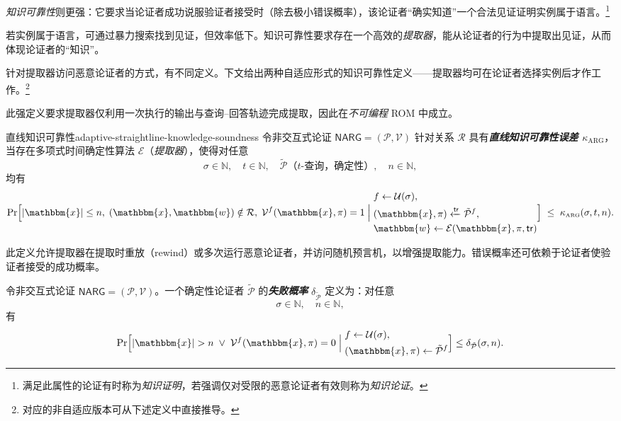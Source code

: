 \documentclass[american,singlepageview]{snargs-book-zh}
\newcommand{\defemph}[1]{\textbf{\emph{#1}}}
\newcommand{\Malicious}[1]{\tilde{#1}}
\newcommand{\SomeSize}[1]{|#1|}
\newcommand{\Naturals}{\mathbb{N}}
\newcommand{\Relation}{\mathcal{R}}
\newcommand{\Instance}{\mathbbm{x}}
\newcommand{\Witness}{\mathbbm{w}}
\newcommand{\InstanceSize}{n}
\newcommand{\ProtoProver}{P}
\newcommand{\ProtoVerifier}{V}
\newcommand{\ProtoExtractor}{E}
\newcommand{\ProtoKnowledgeError}{\kappa}
\newcommand{\NARGSymbol}{\mathsf{NARG}}
\newcommand{\ARGSubscript}{\scriptscriptstyle\mathrm{ARG}}
\newcommand{\ARGFormat}[1]{\mathcal{#1}}
\newcommand{\ARGProver}{\ARGFormat{\ProtoProver}}
\newcommand{\ARGVerifier}{\ARGFormat{\ProtoVerifier}}
\newcommand{\ARGSystem}{(\ARGProver,\ARGVerifier)}
\newcommand{\ARGExtractor}{\ARGFormat{\ProtoExtractor}}
\newcommand{\ARGString}{\pi}
\newcommand{\ARGKnowledgeError}{\ProtoKnowledgeError_{\ARGSubscript}}
\newcommand{\ProverFailureProbability}[1]{\delta_{#1}}
\newcommand{\ROFunction}{f}
\newcommand{\ROQueryBound}{t}
\newcommand{\RODistribution}[1]{\mathcal{U}(#1)}
\newcommand{\ROOutputAndTrace}[4]{#4 \xleftarrow{#3} {#2}^{#1}}
\newcommand{\ROTrace}{\mathsf{tr}}
\newcommand{\ROOutputSize}{\sigma}
\begin{document}
\emph{知识可靠性}则更强：它要求当论证者成功说服验证者接受时（除去极小错误概率），该论证者“确实知道”一个合法见证证明实例属于语言。\footnote{满足此属性的论证有时称为\emph{知识证明}，若强调仅对受限的恶意论证者有效则称为\emph{知识论证}。}

若实例属于语言，可通过暴力搜索找到见证，但效率低下。知识可靠性要求存在一个高效的\emph{提取器}，能从论证者的行为中提取出见证，从而体现论证者的“知识”。

针对提取器访问恶意论证者的方式，有不同定义。下文给出两种自适应形式的知识可靠性定义——提取器均可在论证者选择实例后才作工作。\footnote{对应的非自适应版本可从下述定义中直接推导。}

此强定义要求提取器仅利用一次执行的输出与查询–回答轨迹完成提取，因此在\emph{不可编程} ROM 中成立。

\begin{ImportantDefinition}{直线知识可靠性}{adaptive-straightline-knowledge-soundness}
令非交互式论证 $\NARGSymbol=\ARGSystem$ 针对关系 $\Relation$ 具有\defemph{直线知识可靠性误差 $\ARGKnowledgeError$}，当存在多项式时间确定性算法 $\ARGExtractor$（\emph{提取器}），使得对任意
\[
\ROOutputSize\in\Naturals,\quad
\ROQueryBound\in\Naturals,\quad
\Malicious{\ARGProver}\text{（$\ROQueryBound$-查询，确定性）},\quad
\InstanceSize\in\Naturals,
\]
均有
\[
\Pr\Bigl[
  \SomeSize{\Instance}\le \InstanceSize,\;
  (\Instance,\Witness)\notin \Relation,\;
  \ARGVerifier^{\ROFunction}(\Instance,\ARGString)=1
  \;\Big|\;
  \begin{aligned}
    &\ROFunction\gets\RODistribution{\ROOutputSize},\\
    &\ROOutputAndTrace{\ROFunction}{\Malicious{\ARGProver}}{\ROTrace}{(\Instance,\ARGString)},\\
    &\Witness\gets\ARGExtractor(\Instance,\ARGString,\ROTrace)
  \end{aligned}
\Bigr]
\;\le\;
\ARGKnowledgeError(\ROOutputSize,\ROQueryBound,\InstanceSize).
\]
\end{ImportantDefinition}

此定义允许提取器在提取时重放（rewind）或多次运行恶意论证者，并访问随机预言机，以增强提取能力。错误概率还可依赖于论证者使验证者接受的成功概率。

\begin{definition}
\label{definition:argument-failure-probability}
令非交互式论证 $\NARGSymbol=\ARGSystem$。一个确定性论证者 $\Malicious{\ARGProver}$ 的\defemph{失败概率} $\ProverFailureProbability{\Malicious{\ARGProver}}$ 定义为：对任意
\[
\ROOutputSize\in\Naturals,\quad
\InstanceSize\in\Naturals,
\]
有
\[
\Pr\Bigl[
  \SomeSize{\Instance}>\InstanceSize
  \;\lor\;
  \ARGVerifier^{\ROFunction}(\Instance,\ARGString)=0
  \;\Big|\;
  \begin{aligned}
    &\ROFunction\gets\RODistribution{\ROOutputSize},\\
    &(\Instance,\ARGString)\gets\Malicious{\ARGProver}^{\ROFunction}
  \end{aligned}
\Bigr]
\le
\ProverFailureProbability{\Malicious{\ARGProver}}(\ROOutputSize,\InstanceSize).
\]
\end{definition}
\end{document}
